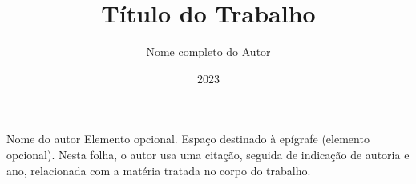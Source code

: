 \documentclass[tcc]{ifbclass/ifbclass}
\title{Título do Trabalho}
\date{2023}
\author{Nome completo do Autor}
\begin{document}
\frontmatter
\frontpage

\presentationpage

\begin{fichacatalografica}
%  
\end{fichacatalografica}

\banca
  
\acknowledgements %


\begin{epigraph}[]{Nome do autor} %
Elemento opcional. Espaço destinado à epígrafe (elemento opcional). Nesta folha, o autor usa uma citação, seguida de indicação de autoria e ano, relacionada com a matéria tratada no corpo do trabalho.
\end{epigraph}

\resumo
\setlength{\parindent}{0pt}


  
\abstract
\setlength{\parindent}{0pt}




\listoffigures

\listoftables

\listofacronyms


\tableofcontents

\mainmatter









\begin{references}
  
\end{references}
\end{document}
